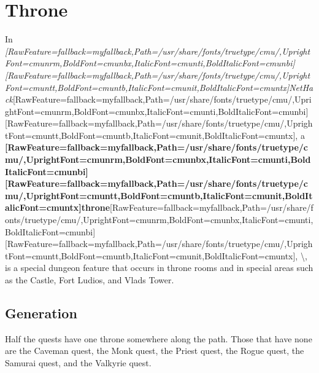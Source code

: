 \chapter{Throne}

In {\itshape \allowbreak{}\setmainfont{cmunti.ttf}[RawFeature={fallback=myfallback},Path=/usr/share/fonts/truetype/cmu/,UprightFont=cmunrm,BoldFont=cmunbx,ItalicFont=cmunti,BoldItalicFont=cmunbi]\setmonofont{cmunti.ttf}[RawFeature={fallback=myfallback},Path=/usr/share/fonts/truetype/cmu/,UprightFont=cmuntt,BoldFont=cmuntb,ItalicFont=cmunit,BoldItalicFont=cmuntx]\itshape NetHack\footnotemark[24]}\allowbreak{}\setmainfont{cmunrm.ttf}[RawFeature={fallback=myfallback},Path=/usr/share/fonts/truetype/cmu/,UprightFont=cmunrm,BoldFont=cmunbx,ItalicFont=cmunti,BoldItalicFont=cmunbi]\setmonofont{cmunrm.ttf}[RawFeature={fallback=myfallback},Path=/usr/share/fonts/truetype/cmu/,UprightFont=cmuntt,BoldFont=cmuntb,ItalicFont=cmunit,BoldItalicFont=cmuntx], a {\bfseries \allowbreak{}\setmainfont{cmunbx.ttf}[RawFeature={fallback=myfallback},Path=/usr/share/fonts/truetype/cmu/,UprightFont=cmunrm,BoldFont=cmunbx,ItalicFont=cmunti,BoldItalicFont=cmunbi]\setmonofont{cmunbx.ttf}[RawFeature={fallback=myfallback},Path=/usr/share/fonts/truetype/cmu/,UprightFont=cmuntt,BoldFont=cmuntb,ItalicFont=cmunit,BoldItalicFont=cmuntx]\bfseries throne}\allowbreak{}\setmainfont{cmunrm.ttf}[RawFeature={fallback=myfallback},Path=/usr/share/fonts/truetype/cmu/,UprightFont=cmunrm,BoldFont=cmunbx,ItalicFont=cmunti,BoldItalicFont=cmunbi]\setmonofont{cmunrm.ttf}[RawFeature={fallback=myfallback},Path=/usr/share/fonts/truetype/cmu/,UprightFont=cmuntt,BoldFont=cmuntb,ItalicFont=cmunit,BoldItalicFont=cmuntx], \textbackslash{}, is a special dungeon feature\footnotemark[25] that occurs in throne rooms\footnotemark[26] and in special areas such as the Castle\footnotemark[27], Fort Ludios\footnotemark[28], and Vlad\textquotesingle{}s Tower\footnotemark[29].

\section{Generation}
\label{1}
Half the quests\footnotemark[30] have one throne somewhere along the path. Those that have none are the Caveman quest\footnotemark[31], the Monk quest\footnotemark[32], the Priest quest\footnotemark[33], the Rogue quest\footnotemark[34], the Samurai quest\footnotemark[35], and the Valkyrie quest\footnotemark[36].


